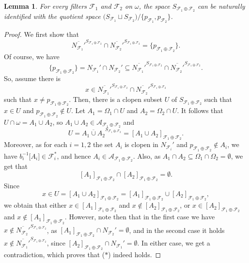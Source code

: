 \documentclass[a4paper,11pt,fleqn]{amsart}
\newtheorem{lemma}[theorem]{Lemma}
\theoremstyle{definition}
\theoremstyle{remark}
\numberwithin{equation}{section}
\newcommand{\aA}{\mathcal{A}}
\newcommand{\fF}{\mathcal{F}}
\newcommand{\sub}{\subseteq}
\newcommand{\clopen}[1]{\left[#1\right]}
\begin{document}
\begin{lemma}\label{lemma:sf_sum}
    For every filters $\fF_1$ and $\fF_2$ on $\omega$, the space $S_{\fF_1\oplus \fF_2}$ can be naturally identified with the quotient space $\big(S_{\fF_1}\sqcup S_{\fF_2}\big)/\big\{p_{\fF_1},p_{\fF_2}\big\}$.
\end{lemma}
\begin{proof}
    We first show that
    \[\tag{$*$}\overline{N_{\fF_1}'}^{S_{\fF_1\oplus \fF_2}}\cap\overline{N_{\fF_2}'}^{S_{\fF_1\oplus \fF_2}}=\big\{p_{\fF_1\oplus \fF_2}\big\}.\] 
    Of course, we have
    \[\big\{p_{\fF_1\oplus \fF_2}\big\}=N_{\fF_1}'\cap N_{\fF_2}'\sub\overline{N_{\fF_1}'}^{S_{\fF_1\oplus \fF_2}}\cap\overline{N_{\fF_2}'}^{S_{\fF_1\oplus \fF_2}}.\]
    So, assume there is
    \[x\in\overline{N_{\fF_1}'}^{S_{\fF_1\oplus \fF_2}}\cap\overline{N_{\fF_2}'}^{S_{\fF_1\oplus \fF_2}}\]
    such that $x\neq p_{\fF_1\oplus \fF_2}$. 
    Then, there is a clopen subset $U$ of $S_{\fF_1\oplus\fF_2}$ such that $x\in U$ and $p_{\fF_1\oplus\fF_2}\not\in U$. Let $A_1=\Omega_1\cap U$ and $A_2=\Omega_2\cap U$. It follows that $U\cap\omega=A_1\cup A_2$, so $A_1\cup A_2\in\aA_{\fF_1\oplus\fF_2}$ and
    \[U=\overline{A_1\cup A_2}^{S_{\fF_1\oplus\fF_2}}=\clopen{A_1\cup A_2}_{\fF_1\oplus\fF_2}.\]
    Moreover, as for each $i=1,2$ the set $A_i$ is clopen in $N_{\fF_i}'$ and $p_{\fF_1\oplus\fF_2}\not\in A_i$, we have $b_i^{-1}\big[A_i\big]\in\fF_i^*$, and hence $A_i\in\aA_{\fF_1\oplus\fF_2}$. Also, as $A_1\cap A_2\sub \Omega_1\cap \Omega_2=\emptyset$, we get that 
    \[\clopen{A_1}_{\fF_1\oplus\fF_2}\cap\clopen{A_2}_{\fF_1\oplus\fF_2}=\emptyset.\]
    Since
    \[x\in U=\clopen{A_1\cup A_2}_{\fF_1\oplus\fF_2}=\clopen{A_1}_{\fF_1\oplus\fF_2}\cup\clopen{A_2}_{\fF_1\oplus\fF_2},\]
    we obtain that either $x\in\clopen{A_1}_{\fF_1\oplus\fF_2}$ and $x\not\in\clopen{A_2}_{\fF_1\oplus\fF_2}$, or $x\in\clopen{A_2}_{\fF_1\oplus\fF_2}$ and $x\not\in\clopen{A_1}_{\fF_1\oplus\fF_2}$. However, note then that in the first case we have $x\not\in\overline{N_{\fF_2}'}^{S_{\fF_1\oplus \fF_2}}$, as $\clopen{A_1}_{\fF_1\oplus\fF_2}\cap N_{\fF_2}'=\emptyset$, and in the second case it holds $x\not\in\overline{N_{\fF_1}'}^{S_{\fF_1\oplus \fF_2}}$, since $\clopen{A_2}_{\fF_1\oplus\fF_2}\cap N_{\fF_1}'=\emptyset$. In either case, we get a contradiction, which proves that ($*$) indeed holds.


\end{proof}
\end{document}
